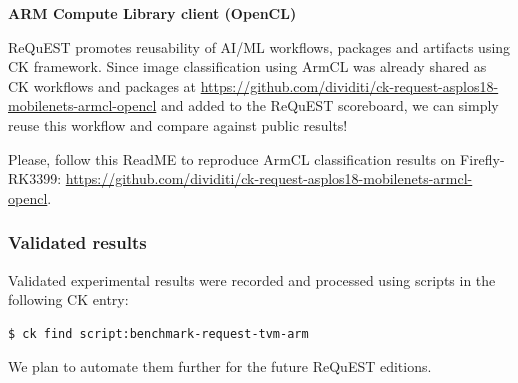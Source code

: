 \documentclass[sigplan]{acmart}
\begin{document}
\textbf{ARM Compute Library client (OpenCL)}

ReQuEST promotes reusability of AI/ML workflows, packages and artifacts using CK framework. 
Since image classification using ArmCL was already shared as CK workflows and packages 
at \url{https://github.com/dividiti/ck-request-asplos18-mobilenets-armcl-opencl} and added to the ReQuEST scoreboard, 
we can simply reuse this workflow and compare against public results!

Please, follow this ReadME to reproduce ArmCL classification results on Firefly-RK3399: 
\url{https://github.com/dividiti/ck-request-asplos18-mobilenets-armcl-opencl}.

\subsubsection{Validated results}

Validated experimental results were recorded and processed using scripts in the following CK entry:

\begin{verbatim}
$ ck find script:benchmark-request-tvm-arm
\end{verbatim}

We plan to automate them further for the future ReQuEST editions.
\end{document}
